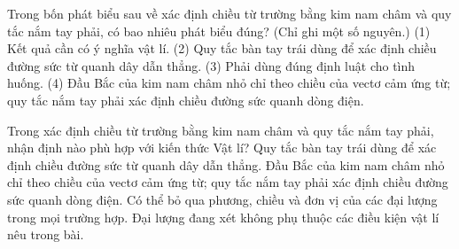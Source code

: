 \begin{ex}
Trong bốn phát biểu sau về xác định chiều từ trường bằng kim nam châm và quy tắc nắm tay phải, có bao nhiêu phát biểu đúng? (Chỉ ghi một số nguyên.) (1) Kết quả cần có ý nghĩa vật lí. (2) Quy tắc bàn tay trái dùng để xác định chiều đường sức từ quanh dây dẫn thẳng. (3) Phải dùng đúng định luật cho tình huống. (4) Đầu Bắc của kim nam châm nhỏ chỉ theo chiều của vectơ cảm ứng từ; quy tắc nắm tay phải xác định chiều đường sức quanh dòng điện.
\end{ex}

\begin{ex}
Trong xác định chiều từ trường bằng kim nam châm và quy tắc nắm tay phải, nhận định nào phù hợp với kiến thức Vật lí?
\choice
{Quy tắc bàn tay trái dùng để xác định chiều đường sức từ quanh dây dẫn thẳng.}
{\True Đầu Bắc của kim nam châm nhỏ chỉ theo chiều của vectơ cảm ứng từ; quy tắc nắm tay phải xác định chiều đường sức quanh dòng điện.}
{Có thể bỏ qua phương, chiều và đơn vị của các đại lượng trong mọi trường hợp.}
{Đại lượng đang xét không phụ thuộc các điều kiện vật lí nêu trong bài.}
\end{ex}

